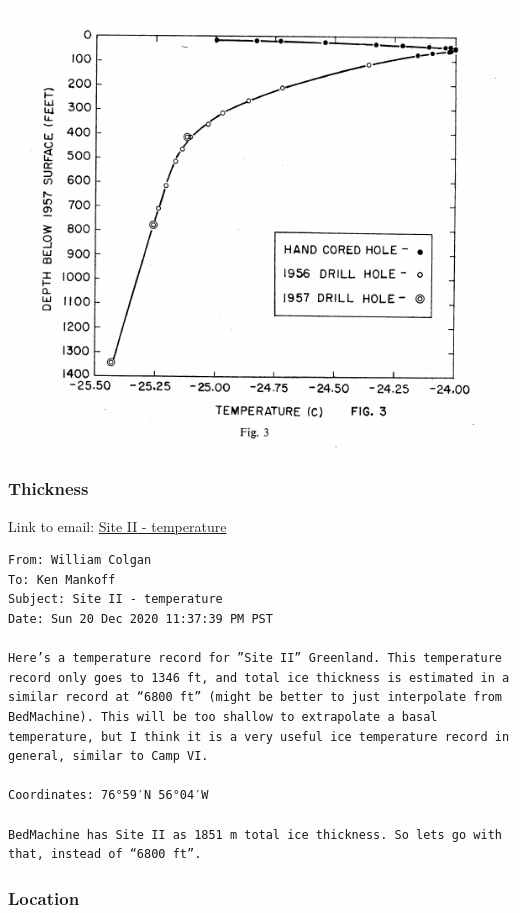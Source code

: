 \documentclass[article,a4paper,times,11pt,twoside]{article}
\begin{document}
\begin{center}
\includegraphics[width=.9\linewidth]{site_ii/hansen_1958_fig3.png}
\end{center}

\subsubsection{Thickness}
\label{sec:orgee94c28}

Link to email: \href{msgid:AM0PR04MB612902A1264CB3D0BA62E550A2C00@AM0PR04MB6129.eurprd04.prod.outlook.com}{Site II - temperature}

\begin{verbatim}
From: William Colgan
To: Ken Mankoff
Subject: Site II - temperature
Date: Sun 20 Dec 2020 11:37:39 PM PST

Here’s a temperature record for ”Site II” Greenland. This temperature
record only goes to 1346 ft, and total ice thickness is estimated in a
similar record at “6800 ft” (might be better to just interpolate from
BedMachine). This will be too shallow to extrapolate a basal
temperature, but I think it is a very useful ice temperature record in
general, similar to Camp VI.

Coordinates: 76°59′N 56°04′W

BedMachine has Site II as 1851 m total ice thickness. So lets go with
that, instead of “6800 ft”.
\end{verbatim}

\subsubsection{Location}
\label{sec:orgfbbfbb9}
\end{document}
